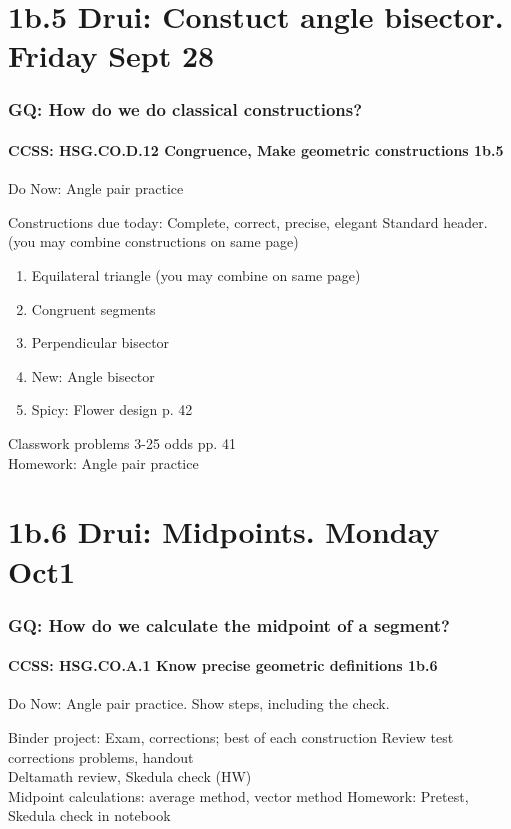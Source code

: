 \documentclass{beamer}
\begin{document}
\section{1b.5 Drui: Constuct angle bisector. Friday Sept 28}
  \frame
  {
    \frametitle{GQ: How do we do classical constructions?}
    \framesubtitle{CCSS: HSG.CO.D.12 Congruence, Make geometric constructions  \alert{1b.5}}
    Do Now: Angle pair practice
    \begin{block}{Constructions due today: Complete, correct, precise, elegant}
      Standard header. (you may combine constructions on same page)
      \begin{enumerate}
          \item Equilateral triangle (you may combine on same page)
          \item Congruent segments
          \item Perpendicular bisector
          \item New: Angle bisector
          \item Spicy: Flower design p. 42
      \end{enumerate}
    \end{block}
    Classwork problems 3-25 odds pp. 41\\
    \vspace{0.5cm}
    Homework: Angle pair practice
  }

\section{1b.6 Drui: Midpoints. Monday Oct1}
  \frame
  {
    \frametitle{GQ: How do we calculate the midpoint of a segment?}
    \framesubtitle{CCSS: HSG.CO.A.1 Know precise geometric definitions  \alert{1b.6}}

    \begin{block}{Do Now: Angle pair practice. Show steps, including the check.}
      \begin{enumerate}
      \end{enumerate}
    \end{block}
    Binder project: Exam, corrections; best of each construction
    Review test corrections problems, handout\\
    Deltamath review, Skedula check (HW)\\
    Midpoint calculations: average method, vector method
    \vspace{0.5cm}
    Homework: Pretest, Skedula check in notebook
  }
\end{document}
